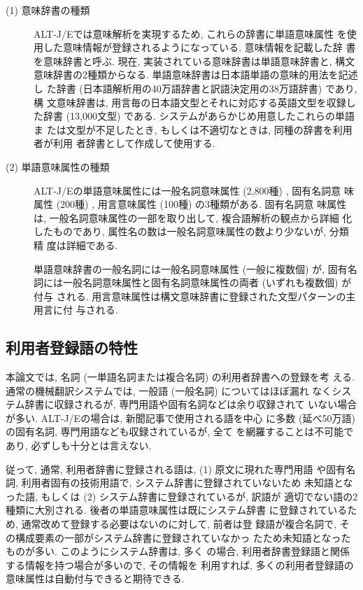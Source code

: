 \begin{description}
\vspace{-0.2mm}
\item [ (1) 意味辞書の種類]
ALT-J/Eでは意味解析を実現するため, これらの辞書に単語意味属性
を使用した意味情報が登録されるようになっている. 意味情報を記載した辞
書を意味辞書と呼ぶ. 現在, 実装されている意味辞書は単語意味辞書と, 構文
意味辞書の2種類からなる. 単語意味辞書は日本語単語の意味的用法を記述し
た辞書 (日本語解析用の40万語辞書と訳語決定用の38万語辞書) であり, 構
文意味辞書は, 用言毎の日本語文型とそれに対応する英語文型を収録した辞書
 (13,000文型) である. システムがあらかじめ用意したこれらの単語ま
たは文型が不足したとき, もしくは不適切なときは, 同種の辞書を利用者が利用
者辞書として作成して使用する.  

\item [ (2) 単語意味属性の種類]
ALT-J/Eの単語意味属性には一般名詞意味属性 (2,800種) , 固有名詞意
味属性 (200種) , 用言意味属性 (100種) の3種類がある. 固有名詞意
味属性は, 一般名詞意味属性の一部を取り出して, 複合語解析の観点から詳細
化したものであり, 属性名の数は一般名詞意味属性の数より少ないが, 分類精
度は詳細である.  

単語意味辞書の一般名詞には一般名詞意味属性 (一般に複数個) が, 固有名
詞には一般名詞意味属性と固有名詞意味属性の両者 (いずれも複数個) が付与
される. 用言意味属性は構文意味辞書に登録された文型パターンの主用言に付
与される\cite{Nakaiwa:1992}.  

\end{description}

\subsection{利用者登録語の特性}
\label{sec:2.2}

本論文では, 名詞 (一単語名詞または複合名詞) の利用者辞書への登録を考
える. 通常の機械翻訳システムでは, 一般語 (一般名詞) についてはほぼ漏れ
なくシステム辞書に収録されるが, 専門用語や固有名詞などは余り収録されて
いない場合が多い. ALT-J/Eの場合は, 新聞記事で使用される語を中心
に多数 (延べ50万語) の固有名詞, 専門用語なども収録されているが, 全て
を網羅することは不可能であり, 必ずしも十分とは言えない.  

従って, 通常, 利用者辞書に登録される語は,  (1) 原文に現れた専門用語
や固有名詞, 利用者固有の技術用語で, システム辞書に登録されていないため
未知語となった語, もしくは (2) システム辞書に登録されているが, 訳語が
適切でない語の2種類に大別される. 後者の単語意味属性は既にシステム辞書
に登録されているため, 通常改めて登録する必要はないのに対して, 前者は登
録語が複合名詞で, その構成要素の一部がシステム辞書に登録されていなかっ
たため未知語となったものが多い. このようにシステム辞書は, 多く
の場合, 利用者辞書登録語と関係する情報を持つ場合が多いので, その情報を
利用すれば, 多くの利用者登録語の意味属性は自動付与できると期待できる. 


